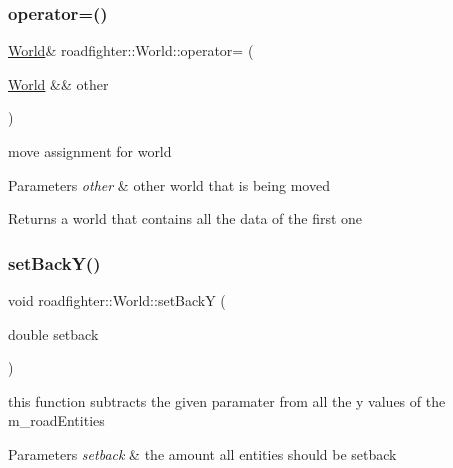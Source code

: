 \subsubsection{\texorpdfstring{operator=()}{operator=()}\hspace{0.1cm}{\footnotesize\ttfamily [2/2]}}
{\footnotesize\ttfamily \hyperlink{classroadfighter_1_1World}{World}\& roadfighter\+::\+World\+::operator= (\begin{DoxyParamCaption}\item[{\hyperlink{classroadfighter_1_1World}{World} \&\&}]{other }\end{DoxyParamCaption})\hspace{0.3cm}{\ttfamily [default]}}

move assignment for world 
\begin{DoxyParams}{Parameters}
{\em other} & other world that is being moved \\
\hline
\end{DoxyParams}
\begin{DoxyReturn}{Returns}
a world that contains all the data of the first one 
\end{DoxyReturn}
\mbox{\label{classroadfighter_1_1World_abaf87df4c66473070ccf57bacbe56419}} 
\subsubsection{\texorpdfstring{set\+Back\+Y()}{setBackY()}}
{\footnotesize\ttfamily void roadfighter\+::\+World\+::set\+BackY (\begin{DoxyParamCaption}\item[{double}]{setback }\end{DoxyParamCaption})}

this function subtracts the given paramater from all the y values of the m\+\_\+road\+Entities 
\begin{DoxyParams}{Parameters}
{\em setback} & the amount all entities should be setback \\
\hline
\end{DoxyParams}
\mbox{\label{classroadfighter_1_1World_a066592a75c8a38e241013707b429206c}} 
